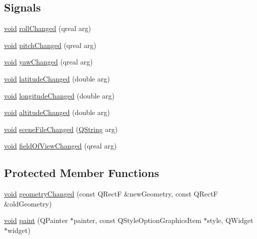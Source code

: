 \subsection*{\-Signals}
\begin{DoxyCompactItemize}
\item 
\hyperlink{group___u_a_v_objects_plugin_ga444cf2ff3f0ecbe028adce838d373f5c}{void} \hyperlink{class_osg_earth_item_adfb0742e8a1938cd6007e6853e9ee3a4}{roll\-Changed} (qreal arg)
\item 
\hyperlink{group___u_a_v_objects_plugin_ga444cf2ff3f0ecbe028adce838d373f5c}{void} \hyperlink{class_osg_earth_item_aa74e77eda223ecf64c45a8eec1219afe}{pitch\-Changed} (qreal arg)
\item 
\hyperlink{group___u_a_v_objects_plugin_ga444cf2ff3f0ecbe028adce838d373f5c}{void} \hyperlink{class_osg_earth_item_a2119a20a59ddce5203ced1b153a7e720}{yaw\-Changed} (qreal arg)
\item 
\hyperlink{group___u_a_v_objects_plugin_ga444cf2ff3f0ecbe028adce838d373f5c}{void} \hyperlink{class_osg_earth_item_a93399296bc97a6dad5b0e2e89580d2b8}{latitude\-Changed} (double arg)
\item 
\hyperlink{group___u_a_v_objects_plugin_ga444cf2ff3f0ecbe028adce838d373f5c}{void} \hyperlink{class_osg_earth_item_a10af4acdf6fdd9a1379e7e416f7a7f89}{longitude\-Changed} (double arg)
\item 
\hyperlink{group___u_a_v_objects_plugin_ga444cf2ff3f0ecbe028adce838d373f5c}{void} \hyperlink{class_osg_earth_item_ac82d42d70bd8ba940faa08ac2b6bb591}{altitude\-Changed} (double arg)
\item 
\hyperlink{group___u_a_v_objects_plugin_ga444cf2ff3f0ecbe028adce838d373f5c}{void} \hyperlink{class_osg_earth_item_a85e722a4910927d8f034c3bda371e104}{scene\-File\-Changed} (\hyperlink{group___u_a_v_objects_plugin_gab9d252f49c333c94a72f97ce3105a32d}{\-Q\-String} arg)
\item 
\hyperlink{group___u_a_v_objects_plugin_ga444cf2ff3f0ecbe028adce838d373f5c}{void} \hyperlink{class_osg_earth_item_a4d93ba686b26c3525d3708b97c04ff67}{field\-Of\-View\-Changed} (qreal arg)
\end{DoxyCompactItemize}
\subsection*{\-Protected \-Member \-Functions}
\begin{DoxyCompactItemize}
\item 
\hyperlink{group___u_a_v_objects_plugin_ga444cf2ff3f0ecbe028adce838d373f5c}{void} \hyperlink{class_osg_earth_item_a80b5e7d3a3e8901f5d641ad7fdd0e681}{geometry\-Changed} (const \-Q\-Rect\-F \&new\-Geometry, const \-Q\-Rect\-F \&old\-Geometry)
\item 
\hyperlink{group___u_a_v_objects_plugin_ga444cf2ff3f0ecbe028adce838d373f5c}{void} \hyperlink{class_osg_earth_item_a6c82923b88816b31454b4c0b4f40a6b2}{paint} (\-Q\-Painter $\ast$painter, const \-Q\-Style\-Option\-Graphics\-Item $\ast$style, \-Q\-Widget $\ast$widget)
\end{DoxyCompactItemize}


